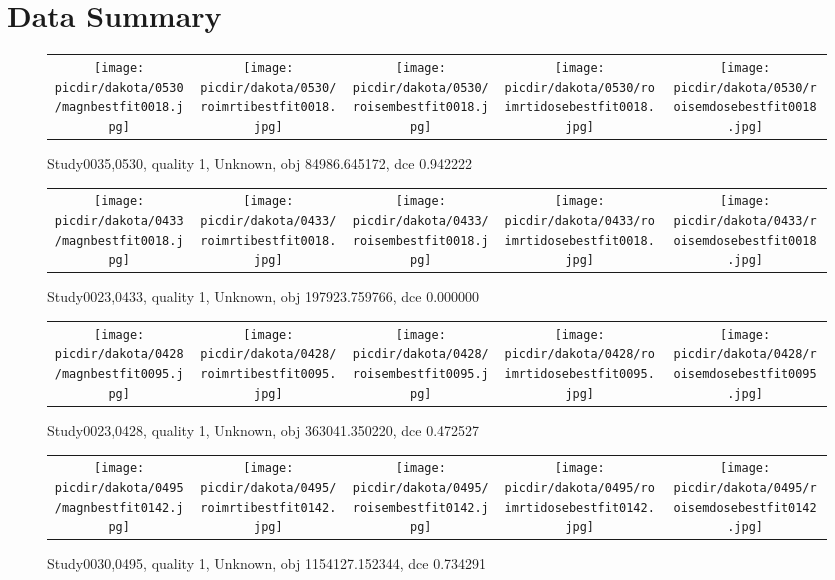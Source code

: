 \documentclass{article}
\newcommand{\picdir}{pdffig}
\begin{document}
\section{Data Summary}
\clearpage
\begin{figure} \begin{tabular}{ccccc} \scalebox{0.21}{\texttt{[image: \\picdir/dakota/0530/magnbestfit0018.jpg]}} & \scalebox{0.21}{\texttt{[image: \\picdir/dakota/0530/roimrtibestfit0018.jpg]}} & \scalebox{0.21}{\texttt{[image: \\picdir/dakota/0530/roisembestfit0018.jpg]}}  & \scalebox{0.21}{\texttt{[image: \\picdir/dakota/0530/roimrtidosebestfit0018.jpg]}} & \scalebox{0.21}{\texttt{[image: \\picdir/dakota/0530/roisemdosebestfit0018.jpg]}} \end{tabular} \caption{Study0035,0530, quality 1, Unknown, obj 84986.645172, dce 0.942222  } \label{Study00350530} \end{figure}
\begin{figure} \begin{tabular}{ccccc} \scalebox{0.21}{\texttt{[image: \\picdir/dakota/0433/magnbestfit0018.jpg]}} & \scalebox{0.21}{\texttt{[image: \\picdir/dakota/0433/roimrtibestfit0018.jpg]}} & \scalebox{0.21}{\texttt{[image: \\picdir/dakota/0433/roisembestfit0018.jpg]}}  & \scalebox{0.21}{\texttt{[image: \\picdir/dakota/0433/roimrtidosebestfit0018.jpg]}} & \scalebox{0.21}{\texttt{[image: \\picdir/dakota/0433/roisemdosebestfit0018.jpg]}} \end{tabular} \caption{Study0023,0433, quality 1, Unknown, obj 197923.759766, dce 0.000000  } \label{Study00230433} \end{figure}
\begin{figure} \begin{tabular}{ccccc} \scalebox{0.21}{\texttt{[image: \\picdir/dakota/0428/magnbestfit0095.jpg]}} & \scalebox{0.21}{\texttt{[image: \\picdir/dakota/0428/roimrtibestfit0095.jpg]}} & \scalebox{0.21}{\texttt{[image: \\picdir/dakota/0428/roisembestfit0095.jpg]}}  & \scalebox{0.21}{\texttt{[image: \\picdir/dakota/0428/roimrtidosebestfit0095.jpg]}} & \scalebox{0.21}{\texttt{[image: \\picdir/dakota/0428/roisemdosebestfit0095.jpg]}} \end{tabular} \caption{Study0023,0428, quality 1, Unknown, obj 363041.350220, dce 0.472527  } \label{Study00230428} \end{figure}
\begin{figure} \begin{tabular}{ccccc} \scalebox{0.21}{\texttt{[image: \\picdir/dakota/0495/magnbestfit0142.jpg]}} & \scalebox{0.21}{\texttt{[image: \\picdir/dakota/0495/roimrtibestfit0142.jpg]}} & \scalebox{0.21}{\texttt{[image: \\picdir/dakota/0495/roisembestfit0142.jpg]}}  & \scalebox{0.21}{\texttt{[image: \\picdir/dakota/0495/roimrtidosebestfit0142.jpg]}} & \scalebox{0.21}{\texttt{[image: \\picdir/dakota/0495/roisemdosebestfit0142.jpg]}} \end{tabular} \caption{Study0030,0495, quality 1, Unknown, obj 1154127.152344, dce 0.734291  } \label{Study00300495} \end{figure}
\end{document}
